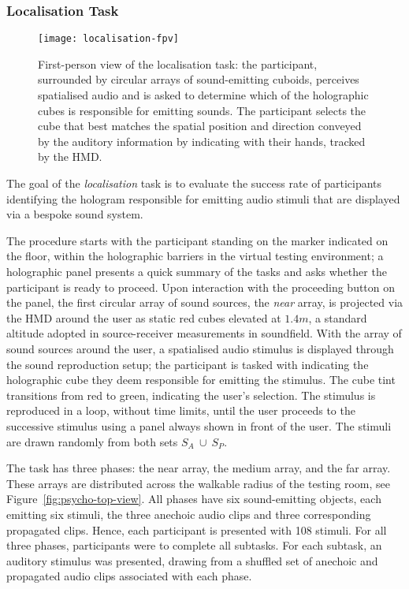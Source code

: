 \subsubsection{Localisation Task}\label{sec:localisation-task-procedure}
\begin{figure}[htbp]
    \centering
    \texttt{[image: localisation-fpv]}
    \caption[Participant's perspective of psychoacoustic testing --- localisation]{First-person view of the localisation task: the participant, surrounded by circular arrays of sound-emitting cuboids, perceives spatialised audio and is asked to determine which of the holographic cubes is responsible for emitting sounds. The participant selects the cube that best matches the spatial position and direction conveyed by the auditory information by indicating with their hands, tracked by the HMD.}\label{fig:localisation-fpv}
\end{figure}
The goal of the \emph{localisation} task is to evaluate the success rate of participants identifying the hologram responsible for emitting audio stimuli that are displayed via a bespoke sound system. \par
The procedure starts with the participant standing on the marker indicated on the floor, within the holographic barriers in the virtual testing environment; a holographic panel presents a quick summary of the tasks and asks whether the participant is ready to proceed. Upon interaction with the proceeding button on the panel, the first circular array of sound sources, the \emph{near} array, is projected via the HMD around the user as static red cubes elevated at $1.4m$, a standard altitude adopted in source-receiver measurements in soundfield. With the array of sound sources around the user, a spatialised audio stimulus is displayed through the sound reproduction setup; the participant is tasked with indicating the holographic cube they deem responsible for emitting the stimulus. The cube tint transitions from red to green, indicating the user's selection. The stimulus is reproduced in a loop, without time limits, until the user proceeds to the successive stimulus using a panel always shown in front of the user. The stimuli are drawn randomly from both sets $S_A~\cup~S_P$.\par
The task has three phases: the near array, the medium array, and the far array. These arrays are distributed across the walkable radius of the testing room, see Figure~\ref{fig:psycho-top-view}. All phases have six sound-emitting objects, each emitting six stimuli, the three anechoic audio clips and three corresponding propagated clips. Hence, each participant is presented with 108 stimuli. For all three phases, participants were to complete all subtasks. For each subtask, an auditory stimulus was presented, drawing from a shuffled set of anechoic and propagated audio clips associated with each phase. \par

